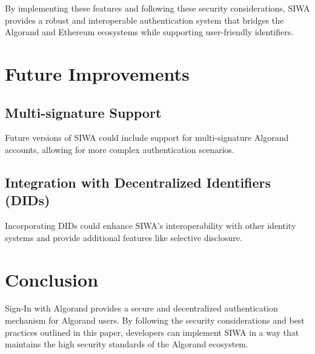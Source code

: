 \documentclass[12pt, a4paper, twocolumn]{article}
\begin{document}
By implementing these features and following these security considerations, SIWA provides a robust and interoperable authentication system that bridges the Algorand and Ethereum ecosystems while supporting user-friendly identifiers.

\section{Future Improvements}

\subsection{Multi-signature Support}

Future versions of SIWA could include support for multi-signature Algorand accounts, allowing for more complex authentication scenarios.

\subsection{Integration with Decentralized Identifiers (DIDs)}

Incorporating DIDs could enhance SIWA's interoperability with other identity systems and provide additional features like selective disclosure.

\section{Conclusion}

Sign-In with Algorand provides a secure and decentralized authentication mechanism for Algorand users. By following the security considerations and best practices outlined in this paper, developers can implement SIWA in a way that maintains the high security standards of the Algorand ecosystem.


\nocite{*}


\end{document}
